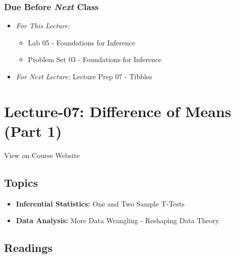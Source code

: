 \documentclass[]{book}
\providecommand{\tightlist}{%
  \setlength{\itemsep}{0pt}\setlength{\parskip}{0pt}}
\theoremstyle{definition}
\theoremstyle{definition}
\theoremstyle{definition}
\theoremstyle{remark}
\begin{document}
\hypertarget{due-before-next-class-6}{%
\subsubsection*{\texorpdfstring{Due Before \emph{Next}
Class}{Due Before Next Class}}\label{due-before-next-class-6}}

\begin{itemize}
\tightlist
\item
  \emph{For This Lecture:}

  \begin{itemize}
  \tightlist
  \item
    Lab 05 - Foundations for Inference
  \item
    Problem Set 03 - Foundations for Inference
  \end{itemize}
\item
  \emph{For Next Lecture:} Lecture Prep 07 - Tibbles
\end{itemize}

\hypertarget{lecture-07-difference-of-means-part-1}{%
\section*{Lecture-07: Difference of Means (Part
1)}\label{lecture-07-difference-of-means-part-1}}

View on Course Website

\hypertarget{topics-7}{%
\subsection*{Topics}\label{topics-7}}

\begin{itemize}
\tightlist
\item
  \textbf{Inferential Statistics:} One and Two Sample T-Tests
\item
  \textbf{Data Analysis:} More Data Wrangling - Reshaping Data Theory
\end{itemize}

\hypertarget{readings-8}{%
\subsection*{Readings}\label{readings-8}}
\end{document}
